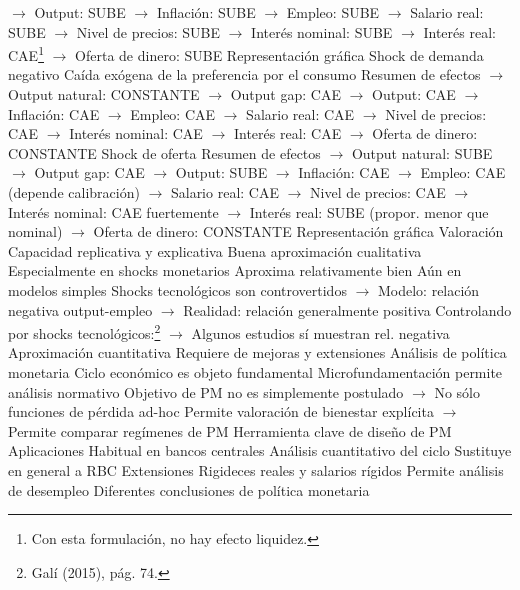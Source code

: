 \documentclass{nuevotema}
\begin{document}
\begin{esquemal}
				\4[] $\to$ Output: SUBE
				\4[] $\to$ Inflación: SUBE
				\4[] $\to$ Empleo: SUBE
				\4[] $\to$ Salario real: SUBE
				\4[] $\to$ Nivel de precios: SUBE
				\4[] $\to$ Interés nominal: SUBE
				\4[] $\to$ Interés real: CAE\footnote{Con esta formulación, no hay efecto liquidez.}
				\4[] $\to$ Oferta de dinero: SUBE
				\4[] Representación gráfica
				\4[] 
				\4 Shock de demanda negativo
				\4[] Caída exógena de la preferencia por el consumo
				\4[] Resumen de efectos
				\4[] $\to$ Output natural: CONSTANTE
				\4[] $\to$ Output gap: CAE
				\4[] $\to$ Output: CAE
				\4[] $\to$ Inflación: CAE
				\4[] $\to$ Empleo: CAE
				\4[] $\to$ Salario real: CAE
				\4[] $\to$ Nivel de precios: CAE
				\4[] $\to$ Interés nominal: CAE
				\4[] $\to$ Interés real: CAE
				\4[] $\to$ Oferta de dinero: CONSTANTE
				\4[] 
				\4 Shock de oferta
				\4[] Resumen de efectos
				\4[] $\to$ Output natural: SUBE
				\4[] $\to$ Output gap: CAE
				\4[] $\to$ Output: SUBE
				\4[] $\to$ Inflación: CAE
				\4[] $\to$ Empleo: CAE (depende calibración)
				\4[] $\to$ Salario real: CAE
				\4[] $\to$ Nivel de precios: CAE
				\4[] $\to$ Interés nominal: CAE fuertemente
				\4[] $\to$ Interés real: SUBE (propor. menor que nominal)
				\4[] $\to$ Oferta de dinero: CONSTANTE
				\4[] Representación gráfica
				\4[] 
		\2 Valoración
			\3 Capacidad replicativa y explicativa
				\4 Buena aproximación cualitativa
				\4[] Especialmente en shocks monetarios
				\4[] Aproxima relativamente bien
				\4[] Aún en modelos simples
				\4[] Shocks tecnológicos son controvertidos
				\4[] $\to$ Modelo: relación negativa output-empleo
				\4[] $\to$ Realidad: relación generalmente positiva
				\4[] Controlando por shocks tecnológicos:\footnote{Galí (2015), pág. 74.}
				\4[] $\to$ Algunos estudios sí muestran rel. negativa
				\4 Aproximación cuantitativa
				\4[] Requiere de mejoras y extensiones
			\3 Análisis de política monetaria
				\4 Ciclo económico es objeto fundamental
				\4 Microfundamentación permite análisis normativo
				\4[] Objetivo de PM no es simplemente postulado
				\4[] $\to$ No sólo funciones de pérdida ad-hoc
				\4[] Permite valoración de bienestar explícita
				\4[] $\to$ Permite comparar regímenes de PM
				\4[$\to$] Herramienta clave de diseño de PM
			\3 Aplicaciones
				\4 Habitual en bancos centrales
				\4 Análisis cuantitativo del ciclo
				\4 Sustituye en general a RBC
			\3 Extensiones
				\4 Rigideces reales y salarios rígidos
				\4[] Permite análisis de desempleo
				\4[] Diferentes conclusiones de política monetaria

\end{esquemal}
\end{document}
